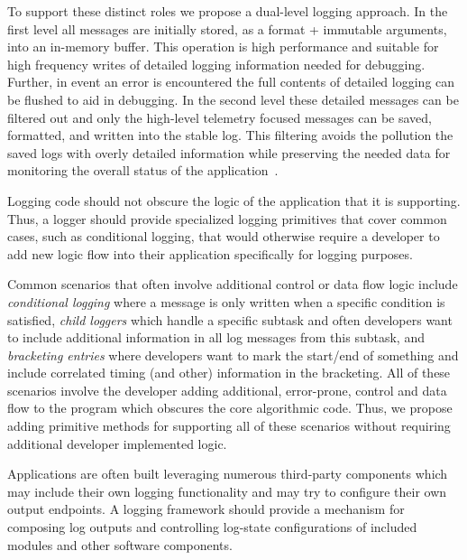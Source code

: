 To support these distinct roles we propose a dual-level logging approach. In the 
first level all messages are initially stored, as a format + immutable 
arguments, into an in-memory buffer. This operation is high performance and 
suitable for high frequency writes of detailed logging information needed for 
debugging. Further, in event an error is encountered the full contents of 
detailed logging can be flushed to aid in debugging. In the second level these 
detailed messages can be filtered out and only the high-level telemetry focused 
messages can be saved, formatted, and written into the stable log. This filtering 
avoids the pollution the saved logs with overly detailed information while 
preserving the needed data for monitoring the overall status of the application~\cite{logstudy,logstudy2}. 

\begin{design}
Logging code should not obscure the logic of the application that it is 
supporting. Thus, a logger should provide specialized logging primitives 
that cover common cases, such as conditional logging, that would otherwise 
require a developer to add new logic flow into their application specifically 
for logging purposes.
\end{design}

Common scenarios that often involve additional control or data flow logic 
include \emph{conditional logging} where a message is only written when a 
specific condition is satisfied, \emph{child loggers} which handle a specific 
subtask and often developers want to include additional information in all 
log messages from this subtask, and \emph{bracketing entries} where 
developers want to mark the start/end of something and include correlated 
timing (and other) information in the bracketing. All of these scenarios 
involve the developer adding additional, error-prone, control and data flow 
to the program which obscures the core algorithmic code. Thus, we propose 
adding primitive methods for supporting all of these scenarios without requiring 
additional developer implemented logic.

\begin{design}
Applications are often built leveraging numerous third-party components which 
may include their own logging functionality and may try to configure their own 
output endpoints. A logging framework should provide a mechanism for composing 
log outputs and controlling log-state configurations of included modules and 
other software components.
\end{design}

